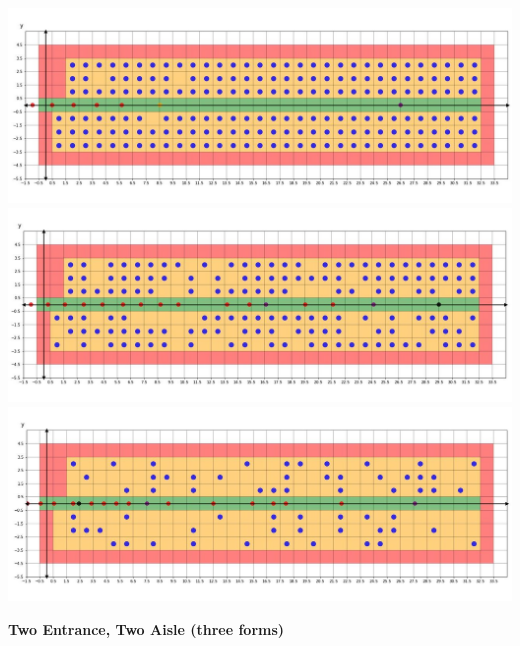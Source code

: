 \documentclass{article}
\theoremstyle{definition}
\theoremstyle{remark}
\numberwithin{equation}{section}
\begin{document}
	\begin{center}
		\clearpage
		\thispagestyle{empty}
		\includegraphics[width=14cm]{random1.jpg}\\
		\includegraphics[width=14cm]{random2.jpg}\\
		\includegraphics[width=14cm]{random3.jpg}\\
	\end{center}
	\large \textbf{Two Entrance, Two Aisle (three forms)}
\end{document}
